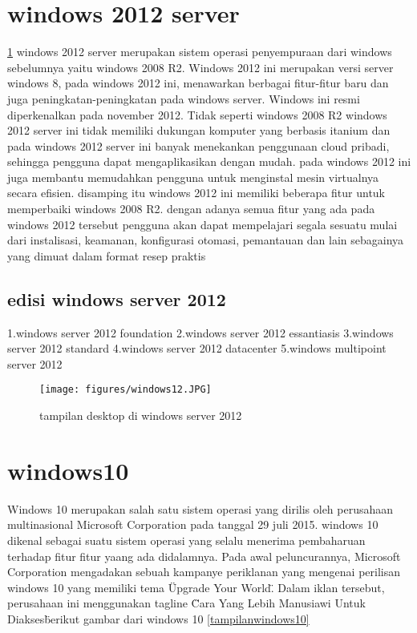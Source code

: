 \begin{enumerate}
	\section{windows 2012 server}
		\ref{windows12} windows 2012 server merupakan sistem operasi penyempuraan dari windows sebelumnya yaitu windows 2008 R2. Windows 2012 ini merupakan versi server windows 8, pada windows 2012 ini, 
		menawarkan berbagai fitur-fitur baru dan juga peningkatan-peningkatan pada windows server. Windows ini resmi diperkenalkan pada november 2012. Tidak seperti windows 2008 R2 windows 
		2012 server ini tidak memiliki dukungan komputer yang berbasis itanium dan pada windows 2012 server ini banyak menekankan penggunaan cloud pribadi, sehingga pengguna dapat 
		mengaplikasikan dengan mudah. pada windows 2012 ini juga membantu memudahkan pengguna untuk menginstal mesin virtualnya secara efisien. disamping itu windows 2012 ini memiliki beberapa
		fitur untuk memperbaiki windows 2008 R2. dengan adanya semua fitur yang ada pada windows 2012 tersebut pengguna akan dapat mempelajari segala sesuatu mulai dari instalisasi, 
		keamanan, konfigurasi otomasi, pemantauan dan lain sebagainya yang dimuat dalam format resep praktis\cite{carvalho2012windows}
		\subsection{edisi windows server 2012}
			1.windows server 2012 foundation
			2.windows server 2012 essantiasis
			3.windows server 2012 standard
			4.windows server 2012 datacenter
			5.windows multipoint server 2012

\begin{figure}[ht]
\centerline{\texttt{[image: figures/windows12.JPG]}}
\caption{tampilan desktop di windows server 2012}
\label{windows12}
\end{figure}

	
	\section{windows10}
		Windows 10 merupakan salah satu sistem operasi yang dirilis oleh perusahaan multinasional Microsoft Corporation pada tanggal 29 juli 2015. windows 10 dikenal sebagai suatu sistem 
		operasi yang selalu menerima pembaharuan terhadap fitur fitur yaang ada didalamnya. Pada awal peluncurannya, Microsoft Corporation mengadakan sebuah kampanye periklanan yang 
		mengenai perilisan windows 10 yang memiliki tema \"Upgrade Your World\". Dalam iklan tersebut, perusahaan ini menggunakan tagline \"Cara Yang Lebih Manusiawi Untuk Diakses\" berikut gambar dari windows 10 \ref{tampilanwindows10}

\end{enumerate}
